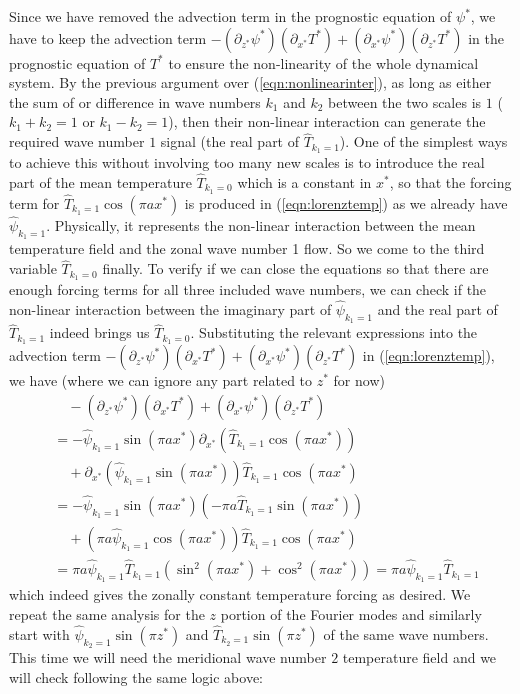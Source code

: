 Since we have removed the advection term in the prognostic equation of $\psi^*$, we have to keep the advection term $- (\partial_{z^*} \psi^*)(\partial_{x^*} T^*) + (\partial_{x^*} \psi^*)(\partial_{z^*} T^*)$ in the prognostic equation of $T^*$ to ensure the non-linearity of the whole dynamical system. By the previous argument over (\ref{eqn:nonlinearinter}), as long as either the sum of or difference in wave numbers $k_1$ and $k_2$ between the two scales is $1$ ($k_1 + k_2 = 1$ or $k_1 - k_2 = 1$), then their non-linear interaction can generate the required wave number $1$ signal (the real part of $\hat{T}_{k_1 = 1}$). One of the simplest ways to achieve this without involving too many new scales is to introduce the real part of the mean temperature $\hat{T}_{k_1 = 0}$ which is a constant in $x^*$, so that the forcing term for $\hat{T}_{k_1 = 1} \cos(\pi ax^*)$ is produced in (\ref{eqn:lorenztemp}) as we already have $\hat{\psi}_{k_1 = 1}$. Physically, it represents the non-linear interaction between the mean temperature field and the zonal wave number 1 flow. So we come to the third variable $\hat{T}_{k_1 = 0}$ finally. To verify if we can close the equations so that there are enough forcing terms for all three included wave numbers, we can check if the non-linear interaction between the imaginary part of $\hat{\psi}_{k_1 = 1}$ and the real part of $\hat{T}_{k_1 = 1}$ indeed brings us $\hat{T}_{k_1 = 0}$. Substituting the relevant expressions into the advection term $-(\partial_{z^*} \psi^*)(\partial_{x^*} T^*) + (\partial_{x^*} \psi^*)(\partial_{z^*} T^*)$ in (\ref{eqn:lorenztemp}), we have (where we can ignore any part related to $z^*$ for now)
\begin{align*}
&\quad -(\partial_{z^*} \psi^*)(\partial_{x^*} T^*) + (\partial_{x^*} \psi^*)(\partial_{z^*} T^*) \\
&= -\hat{\psi}_{k_1 = 1} \sin(\pi a x^*) \partial_{x^*} (\hat{T}_{k_1 = 1} \cos(\pi a x^*)) \\
&\quad + \partial_{x^*}(\hat{\psi}_{k_1 = 1} \sin(\pi a x^*))\hat{T}_{k_1 = 1} \cos(\pi a x^*) \\
&= -\hat{\psi}_{k_1 = 1} \sin(\pi a x^*)(-\pi a\hat{T}_{k_1 = 1}\sin(\pi a x^*)) \\
&\quad + (\pi a\hat{\psi}_{k_1 = 1}\cos(\pi a x^*)) \hat{T}_{k_1 = 1} \cos(\pi a x^*) \\
&= \pi a \hat{\psi}_{k_1 = 1}\hat{T}_{k_1 = 1}(\sin^2(\pi a x^*) + \cos^2(\pi a x^*)) = \pi a \hat{\psi}_{k_1 = 1}\hat{T}_{k_1 = 1}
\end{align*}
which indeed gives the zonally constant temperature forcing as desired. We repeat the same analysis for the $z$ portion of the Fourier modes and similarly start with  $\hat{\psi}_{k_2 = 1}\sin(\pi z^*)$ and $\hat{T}_{k_2 = 1} \sin(\pi z^*)$ of the same wave numbers. This time we will need the meridional wave number $2$ temperature field and we will check following the same logic above:
